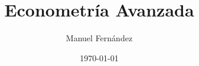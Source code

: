 \DeclareMathOperator{\EX}{\mathbb{E}}%
\newcommand{\Prob}[1]{\text{Pr}\left[#1\right]}
\newcommand{\RK}[1]{\mathbb{R}^{#1}}
\newcommand{\HT}[1]{\mathbb{H}_{#1}}

\newcommand{\xB}{\textbf{x}}
\newcommand{\yB}{\textbf{y}}
\newcommand{\zB}{\textbf{z}}
\newcommand{\wB}{\textbf{w}}
\newcommand{\eB}{\textbf{e}}
\newcommand{\vB}{\textbf{v}}
\newcommand{\AB}{\textbf{A}}
\newcommand{\XB}{\textbf{X}}
\newcommand{\YB}{\textbf{Y}}
\newcommand{\ZB}{\textbf{Z}}
\newcommand{\QB}{\textbf{Q}}
\newcommand{\WB}{\textbf{W}}

\newcommand{\betaB}{\boldsymbol{\beta}}
\newcommand{\gammaB}{\boldsymbol{\gamma}}
\newcommand{\alphaB}{\boldsymbol{\alpha}}
\newcommand{\thetaB}{\boldsymbol{\theta}}
\newcommand{\deltaB}{\boldsymbol{\delta}}
\newcommand{\phiB}{\boldsymbol{\phi}}
\newcommand{\epsilonB}{\boldsymbol{\epsilon}}
\newcommand{\etaB}{\boldsymbol{\eta}}
\newcommand{\betaBH}{\boldsymbol{\hat{\beta}}}
\newcommand{\betaH}{\hat{\beta}}

\newcommand{\brown}[1]{\textcolor{brown}{#1}}
\newcommand{\blue}[1]{\textcolor{blue}{#1}}
\newcommand{\red}[1]{\textcolor{red}{#1}}

\newcommand{\smallspace}{\vspace{0.1cm}}
\newcommand{\mediumspace}{\vspace{0.3cm}}
\newcommand{\largespace}{\vspace{6cm}}

\newcommand\fontvia{\fontsize{4}{6}\selectfont}
\newcommand\fontvib{\fontsize{5}{8}\selectfont}
\newcommand\fontvic{\fontsize{7}{10}\selectfont}
\newcommand\fontvid{\fontsize{8}{11}\selectfont}
\newcommand\fontvie{\fontsize{10}{11}\selectfont}

\newcommand{\sharecell}[3]{%
  \pgfmathtruncatemacro{\vv}{#3}%
  \fill[brown!\vv!white] (#1,#2) rectangle ({#1+1},{#2+1});%
  \draw[gray!40] (#1,#2) rectangle ({#1+1},{#2+1});%
}
\newcommand{\divcell}[3]{%
  \pgfmathtruncatemacro{\absvv}{abs(#3)*2}%
  \pgfmathtruncatemacro{\negflag}{(#3)<0 ? 1 : 0}%
  \ifnum\negflag=1
    \fill[blue!\absvv!white] (#1,#2) rectangle ({#1+1},{#2+1});%
  \else
    \fill[red!\absvv!white] (#1,#2) rectangle ({#1+1},{#2+1});%
  \fi
  \draw[gray!40] (#1,#2) rectangle ({#1+1},{#2+1});%
}
\newcommand{\unifcell}[3]{%
  \pgfmathtruncatemacro{\vv}{#3}%
  \fill[red!\vv!white] (#1,#2) rectangle ({#1+1},{#2+1});%
  \draw[gray!40] (#1,#2) rectangle ({#1+1},{#2+1});%
}

\title{Econometría Avanzada}
\author{Manuel Fernández}
\date{\today}
